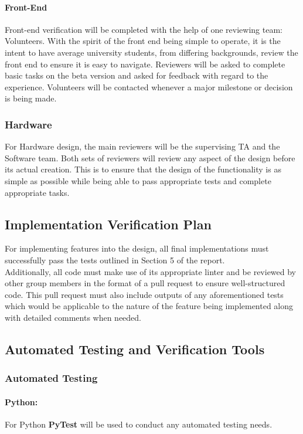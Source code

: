 \documentclass[12pt, titlepage]{article}
\begin{document}
\paragraph{Front-End}Front-end verification will be completed with the help of one reviewing team: Volunteers. With the spirit of the front end being simple to operate, it is the intent to have average university students, from differing backgrounds, review the front end to ensure it is easy to navigate. Reviewers will be asked to complete basic tasks on the beta version and asked for feedback with regard to the experience. Volunteers will be contacted whenever a major milestone or decision is being made.
\subsubsection{Hardware}
For Hardware design, the main reviewers will be the supervising TA and the Software team. Both sets of reviewers will review any aspect of the design before its actual creation. This is to ensure that the design of the functionality is as simple as possible while being able to pass appropriate tests and complete appropriate tasks.


\subsection{Implementation Verification Plan}
For implementing features into the design, all final implementations must successfully pass the tests outlined in Section 5 of the report.\\
Additionally, all code must make use of its appropriate linter and be reviewed by other group members in the format of a pull request to ensure well-structured code. This pull request must also include outputs of any aforementioned tests which would be applicable to the nature of the feature being implemented along with detailed comments when needed.

\subsection{Automated Testing and Verification Tools}
\subsubsection{Automated Testing}
\paragraph{Python:}
For Python \textbf{PyTest} will be used to conduct any automated testing needs.
\end{document}
